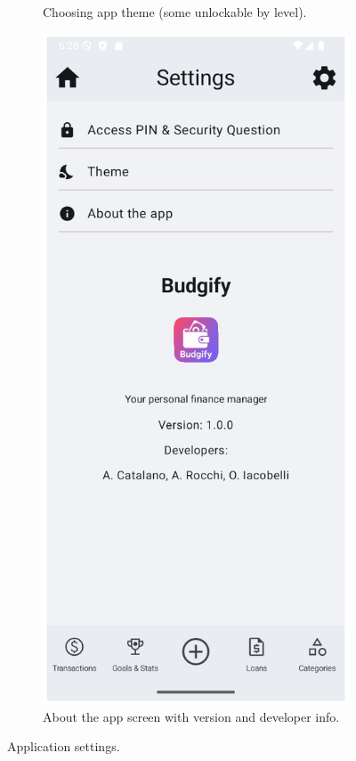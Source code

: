 \documentclass[a4paper,12pt]{article}
\begin{document}
\begin{figure}[H]
\begin{subfigure}[b]{0.23\textwidth}
        \caption{Choosing app theme (some unlockable by level).}
        \label{fig:settings_theme}
    \end{subfigure}
    \hfill
    \begin{subfigure}[b]{0.23\textwidth}
        \includegraphics[width=\textwidth]{settings_about.png}
        \caption{About the app screen with version and developer info.}
        \label{fig:settings_about_app}
    \end{subfigure}
    \caption{Application settings.}
    \label{fig:app_settings}
\end{figure}
\end{document}
